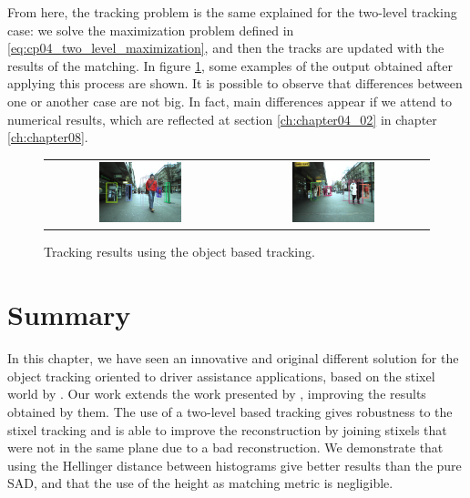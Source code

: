 From here, the tracking problem is the same explained for the two-level tracking case: we solve the maximization problem defined in \ref{eq:cp04_two_level_maximization}, and then the tracks are updated with the results of the matching. In figure \ref{fig:cp04_tracking_examples_object}, some examples of the output obtained after applying this process are shown. It is possible to observe that differences between one or another case are not big. In fact, main differences appear if we attend to numerical results, which are reflected at section \ref{ch:chapter04_02} in chapter \ref{ch:chapter08}.

\begin{figure}[h!]
    \centering
    \begin{tabular}{cc }
      \includegraphics[width=0.45\textwidth]{sequenceObstacle/obstacle15}\label{fig:cp04_object_level_example_30} &
      \includegraphics[width=0.45\textwidth]{sequenceObstacle/obstacle126}\label{fig:cp04_object_level_example_320}
    \end{tabular}
  \caption{Tracking results using the object based tracking.}\label{fig:cp04_tracking_examples_object}
\end{figure}

\section{Summary}\label{ch:chapter04_07}

In this chapter, we have seen an innovative and original different solution for the object tracking oriented to driver assistance applications, based on the stixel world by \cite{badino2009stixel}. Our work extends the work presented by \cite{gunyel2012stixels}, improving the results obtained by them. The use of a two-level based tracking gives robustness to the stixel tracking and is able to improve the reconstruction by joining stixels that were not in the same plane due to a bad reconstruction. We demonstrate that using the Hellinger distance between histograms give better results than the pure \acl{SAD}, and that the use of the height as matching metric is negligible.

